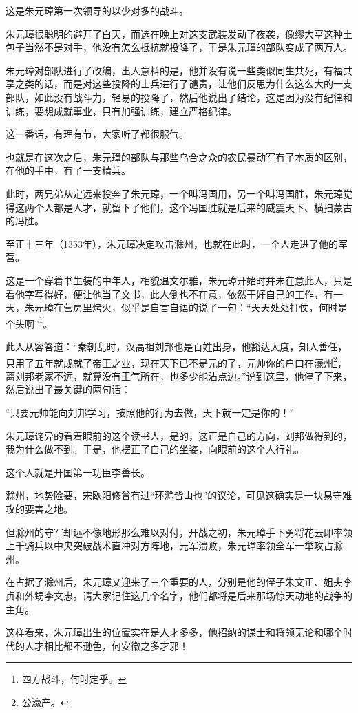 \begin{multicols}{\theparacolNo}
		这是朱元璋第一次领导的以少对多的战斗。

		朱元璋很聪明的避开了白天，而选在晚上对这支武装发动了夜袭，像缪大亨这种土包子当然不是对手，他没有怎么抵抗就投降了，于是朱元璋的部队变成了两万人。

		朱元璋对部队进行了改编，出人意料的是，他并没有说一些类似同生共死，有福共享之类的话，而是对这些投降的士兵进行了谴责，让他们反思为什么这么大的一支部队，如此没有战斗力，轻易的投降了，然后他说出了结论，这是因为没有纪律和训练，要想成就事业，只有加强训练，建立严格纪律。

		这一番话，有理有节，大家听了都很服气。

		也就是在这次之后，朱元璋的部队与那些乌合之众的农民暴动军有了本质的区别，在他的手中，有了一支精兵。

		此时，两兄弟从定远来投奔了朱元璋，一个叫冯国用，另一个叫冯国胜，朱元璋觉得这两个人都是人才，就留下了他们，这个冯国胜就是后来的威震天下、横扫蒙古的冯胜。

		至正十三年（1353年），朱元璋决定攻击滁州，也就在此时，一个人走进了他的军营。

		这是一个穿着书生装的中年人，相貌温文尔雅，朱元璋开始时并未在意此人，只是看他字写得好，便让他当了文书，此人倒也不在意，依然干好自己的工作，有一天，朱元璋在营房里烤火，似乎是自言自语的说了一句：“天天处处打仗，何时是个头啊”\footnote{四方战斗，何时定乎。}。

		此人从容答道：“秦朝乱时，汉高祖刘邦也是百姓出身，他豁达大度，知人善任，只用了五年就成就了帝王之业，现在天下已不是元的了，元帅你的户口在濠州\footnote{公濠产。}，离刘邦老家不远，就算没有王气所在，也多少能沾点边。”说到这里，他停了下来，然后说出了最关键的两句话：

		“只要元帅能向刘邦学习，按照他的行为去做，天下就一定是你的！”

		朱元璋诧异的看着眼前的这个读书人，是的，这正是自己的方向，刘邦做得到的，我为什么做不到。于是，他摆正了自己的坐姿，向眼前的这个人行礼。

		这个人就是开国第一功臣李善长。

		滁州，地势险要，宋欧阳修曾有过“环滁皆山也”的议论，可见这确实是一块易守难攻的要害之地。

		但滁州的守军却远不像地形那么难以对付，开战之初，朱元璋手下勇将花云即率领上千骑兵以中央突破战术直冲对方阵地，元军溃败，朱元璋率领全军一举攻占滁州。

		在占据了滁州后，朱元璋又迎来了三个重要的人，分别是他的侄子朱文正、姐夫李贞和外甥李文忠。请大家记住这几个名字，他们都将是后来那场惊天动地的战争的主角。

		这样看来，朱元璋出生的位置实在是人才多多，他招纳的谋士和将领无论和哪个时代的人才相比都不逊色，何安徽之多才邪！


\end{multicols}
